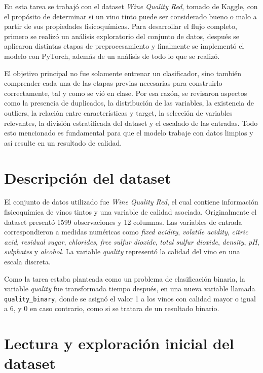 \documentclass[conference]{IEEEtran}
\begin{document}
En esta tarea se trabajó con el dataset \textit{Wine Quality Red}, tomado de Kaggle, con el propósito de determinar si un vino tinto puede ser considerado bueno o malo a partir de sus propiedades fisicoquímicas. Para desarrollar el flujo completo, primero se realizó un análisis exploratorio del conjunto de datos, después se aplicaron distintas etapas de preprocesamiento y finalmente se implementó el modelo con PyTorch, además de un análisis de todo lo que se realizó.

El objetivo principal no fue solamente entrenar un clasificador, sino también comprender cada una de las etapas previas necesarias para construirlo correctamente, tal y como se vió en clase. Por esa razón, se revisaron aspectos como la presencia de duplicados, la distribución de las variables, la existencia de outliers, la relación entre características y target, la selección de variables relevantes, la división estratificada del dataset y el escalado de las entradas. Todo esto mencionado es fundamental para que el modelo trabaje con datos limpios y así resulte en un resultado de calidad.

\section{Descripción del dataset}

El conjunto de datos utilizado fue \textit{Wine Quality Red}, el cual contiene información fisicoquímica de vinos tintos y una variable de calidad asociada. Originalmente el dataset presentó 1599 observaciones y 12 columnas. Las variables de entrada correspondieron a medidas numéricas como \textit{fixed acidity}, \textit{volatile acidity}, \textit{citric acid}, \textit{residual sugar}, \textit{chlorides}, \textit{free sulfur dioxide}, \textit{total sulfur dioxide}, \textit{density}, \textit{pH}, \textit{sulphates} y \textit{alcohol}. La variable \textit{quality} representó la calidad del vino en una escala discreta.

Como la tarea estaba planteada como un problema de clasificación binaria, la variable \textit{quality} fue transformada tiempo después, en una nueva variable llamada \texttt{quality\_binary}, donde se asignó el valor 1 a los vinos con calidad mayor o igual a 6, y 0 en caso contrario, como si se tratara de un resultado binario.

\section{Lectura y exploración inicial del dataset}
\end{document}
